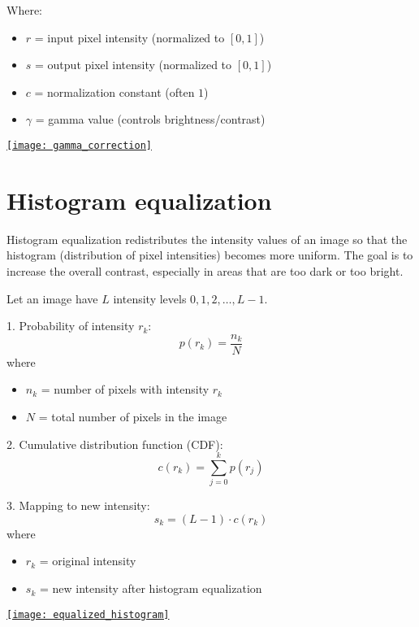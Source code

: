 Where:
\begin{itemize}
    \item $r$ = input pixel intensity (normalized to $[0,1]$)
    \item $s$ = output pixel intensity (normalized to $[0,1]$)
    \item $c$ = normalization constant (often $1$)
    \item $\gamma$ = gamma value (controls brightness/contrast)
\end{itemize}
\begin{center}
  \href{https://github.com/vicente-gonzalez-ruiz/medical_imaging/blob/main/notebooks/gamma_correction.ipynb}{\texttt{[image: gamma\_correction]}}
\end{center}


\section{Histogram equalization}

Histogram equalization redistributes the intensity values of an image so that the histogram (distribution of pixel intensities) becomes more uniform. The goal is to increase the overall contrast, especially in areas that are too dark or too bright.

Let an image have $L$ intensity levels $0, 1, 2, \dots, L-1$.

1. Probability of intensity $r_k$:
\[
p(r_k) = \frac{n_k}{N}
\]
where 
\begin{itemize}
    \item $n_k$ = number of pixels with intensity $r_k$
    \item $N$ = total number of pixels in the image
\end{itemize}

2. Cumulative distribution function (CDF):
\[
c(r_k) = \sum_{j=0}^{k} p(r_j)
\]

3. Mapping to new intensity:
\[
s_k = (L-1) \cdot c(r_k)
\]
where 
\begin{itemize}
    \item $r_k$ = original intensity
    \item $s_k$ = new intensity after histogram equalization
\end{itemize}

\begin{center}
  \href{https://github.com/vicente-gonzalez-ruiz/medical_imaging/blob/main/notebooks/equalized_histogram.ipynb}{\texttt{[image: equalized\_histogram]}}
\end{center}

